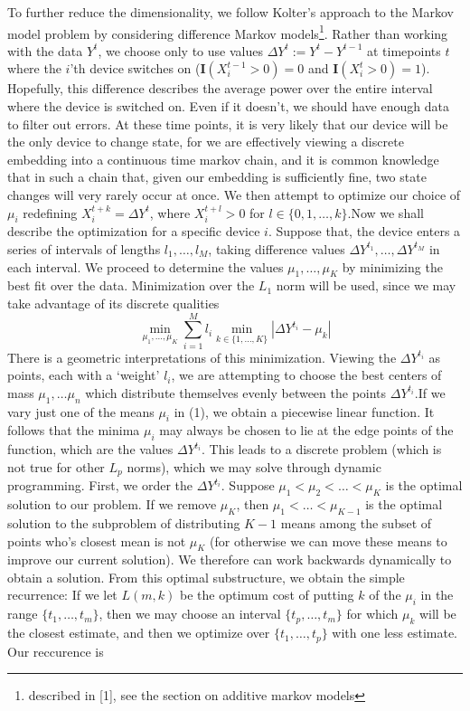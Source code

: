 \documentclass{article}
\begin{document}
%
To further reduce the dimensionality, we follow Kolter's approach to the Markov model problem by considering difference Markov models\footnote{described in [1], see the section on additive markov models}. Rather than working with the data $Y^t$, we choose only to use values $\Delta Y^t := Y^t - Y^{t-1}$ at timepoints $t$ where the $i$'th device switches on ($\mathbf{I}(X_i^{t-1} > 0) = 0$ and $\mathbf{I}(X_i^t > 0) = 1$). Hopefully, this difference describes the average power over the entire interval where the device is switched on. Even if it doesn't, we should have enough data to filter out errors. At these time points, it is very likely that our device will be the only device to change state, for we are effectively viewing a discrete embedding into a continuous time markov chain, and it is common knowledge that in such a chain that, given our embedding is sufficiently fine, two state changes will very rarely occur at once. We then attempt to optimize our choice of $\mu_i$ redefining $X_i^{t + k} = \Delta Y^t$, where $X_i^{t + l} > 0$ for $l \in \{0, 1, \dots, k\}$.
​
Now we shall describe the optimization for a specific device $i$. Suppose that, the device enters a series of intervals of lengths $l_1, \dots, l_M$, taking difference values $\Delta Y^{t_1}, \dots, \Delta Y^{t_M}$ in each interval. We proceed to determine the values $\mu_1, \dots, \mu_K$ by minimizing the best fit over the data. Minimization over the $L_1$ norm will be used, since we may take advantage of its discrete qualities
%
\begin{equation} \min_{\mu_1, \dots, \mu_K} \sum_{i = 1}^M l_i \min_{k \in \{ 1, \dots, K \}}|\Delta Y^{t_i} - \mu_k| \end{equation}
%
There is a geometric interpretations of this minimization. Viewing the $\Delta Y^{t_i}$ as points, each with a `weight' $l_i$, we are attempting to choose the best centers of mass $\mu_1, \dots \mu_n$ which distribute themselves evenly between the points $\Delta Y^{t_i}$.
​
If we vary just one of the means $\mu_i$ in (1), we obtain a piecewise linear function. It follows that the minima $\mu_i$ may always be chosen to lie at the edge points of the function, which are the values $\Delta Y^{t_i}$. This leads to a discrete problem (which is not true for other $L_p$ norms), which we may solve through dynamic programming. First, we order the $\Delta Y^{t_i}$. Suppose $\mu_1 < \mu_2 < \dots < \mu_K$ is the optimal solution to our problem. If we remove $\mu_K$, then $\mu_1 < \dots < \mu_{K-1}$ is the optimal solution to the subproblem of distributing $K-1$ means among the subset of points who's closest mean is not $\mu_K$ (for otherwise we can move these means to improve our current solution). We therefore can work backwards dynamically to obtain a solution. From this optimal substructure, we obtain the simple recurrence: If we let $L(m,k)$ be the optimum cost of putting $k$ of the $\mu_i$ in the range $\{ t_1, \dots, t_m \}$, then we may choose an interval $\{ t_p, \dots, t_m \}$ for which $\mu_k$ will be the closest estimate, and then we optimize over $\{ t_1, \dots, t_p \}$ with one less estimate. Our reccurence is
\end{document}
